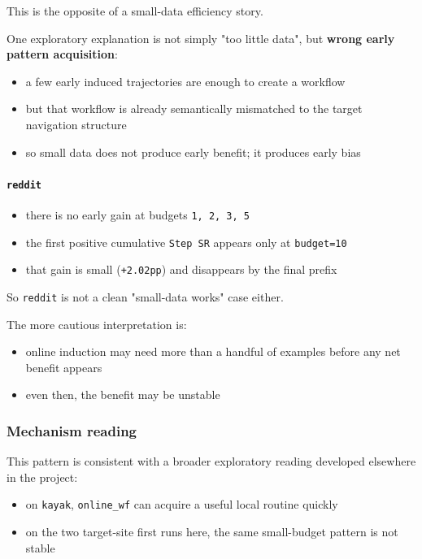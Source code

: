 This is the opposite of a small-data efficiency story.

One exploratory explanation is not simply "too little data", but
\textbf{wrong early pattern acquisition}:

\begin{itemize}
\tightlist
\item
  a few early induced trajectories are enough to create a workflow
\item
  but that workflow is already semantically mismatched to the target
  navigation structure
\item
  so small data does not produce early benefit; it produces early bias
\end{itemize}

\paragraph{\texorpdfstring{\texttt{reddit}}{reddit}}

\begin{itemize}
\tightlist
\item
  there is no early gain at budgets \texttt{1,\ 2,\ 3,\ 5}
\item
  the first positive cumulative \texttt{Step\ SR} appears only at
  \texttt{budget=10}
\item
  that gain is small (\texttt{+2.02pp}) and disappears by the final
  prefix
\end{itemize}

So \texttt{reddit} is not a clean "small-data works" case either.

The more cautious interpretation is:

\begin{itemize}
\tightlist
\item
  online induction may need more than a handful of examples before any
  net benefit appears
\item
  even then, the benefit may be unstable
\end{itemize}

\subsubsection{Mechanism
reading}

This pattern is consistent with a broader exploratory reading developed
elsewhere in the project:

\begin{itemize}
\tightlist
\item
  on \texttt{kayak}, \texttt{online\_wf} can acquire a useful local
  routine quickly
\item
  on the two target-site first runs here, the same small-budget pattern
  is not stable
\end{itemize}


